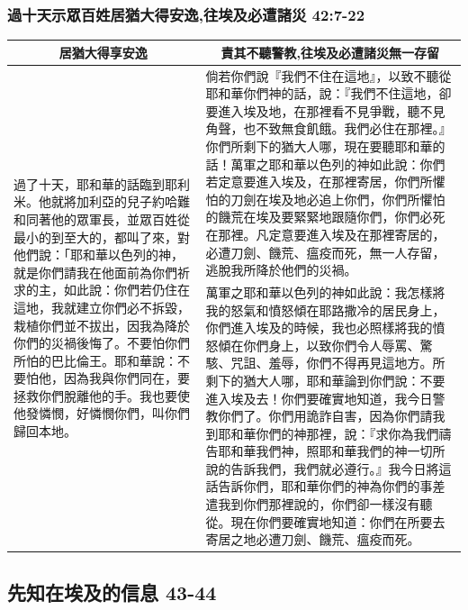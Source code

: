 \subsubsection{過十天示眾百姓居猶大得安逸,往埃及必遭諸災 42:7-22}
\begin{table}[H]
\centering
\begin{tabular}{p{4.8cm}|p{12.50cm}}\hline\hline
\multicolumn{1}{c|}{居猶大得享安逸}&\multicolumn{1}{c}{責其不聽警教,往埃及必遭諸災無一存留}\\\hline
\multirow{2}{5.cm}{過了十天，耶和華的話臨到耶利米。他就將加利亞的兒子約哈難和同著他的眾軍長，並眾百姓從最小的到至大的，都叫了來，對他們說：「耶和華以色列的神，就是你們請我在他面前為你們祈求的主，如此說：你們若仍住在這地，我就建立你們必不拆毀，栽植你們並不拔出，因我為降於你們的災禍後悔了。不要怕你們所怕的巴比倫王。耶和華說：不要怕他，因為我與你們同在，要拯救你們脫離他的手。我也要使他發憐憫，好憐憫你們，叫你們歸回本地。}
&倘若你們說『我們不住在這地』，以致不聽從耶和華你們神的話，說：『我們不住這地，卻要進入埃及地，在那裡看不見爭戰，聽不見角聲，也不致無食飢餓。我們必住在那裡。』你們所剩下的猶大人哪，現在要聽耶和華的話！萬軍之耶和華以色列的神如此說：你們若定意要進入埃及，在那裡寄居，你們所懼怕的刀劍在埃及地必追上你們，你們所懼怕的饑荒在埃及要緊緊地跟隨你們，你們必死在那裡。凡定意要進入埃及在那裡寄居的，必遭刀劍、饑荒、瘟疫而死，無一人存留，逃脫我所降於他們的災禍。\\\cline{2-2}
&萬軍之耶和華以色列的神如此說：我怎樣將我的怒氣和憤怒傾在耶路撒冷的居民身上，你們進入埃及的時候，我也必照樣將我的憤怒傾在你們身上，以致你們令人辱罵、驚駭、咒詛、羞辱，你們不得再見這地方。所剩下的猶大人哪，耶和華論到你們說：不要進入埃及去！你們要確實地知道，我今日警教你們了。你們用詭詐自害，因為你們請我到耶和華你們的神那裡，說：『求你為我們禱告耶和華我們神，照耶和華我們的神一切所說的告訴我們，我們就必遵行。』我今日將這話告訴你們，耶和華你們的神為你們的事差遣我到你們那裡說的，你們卻一樣沒有聽從。現在你們要確實地知道：你們在所要去寄居之地必遭刀劍、饑荒、瘟疫而死。\\\hline
\end{tabular}
\end{table}
 

\subsection{先知在埃及的信息 43-44}

